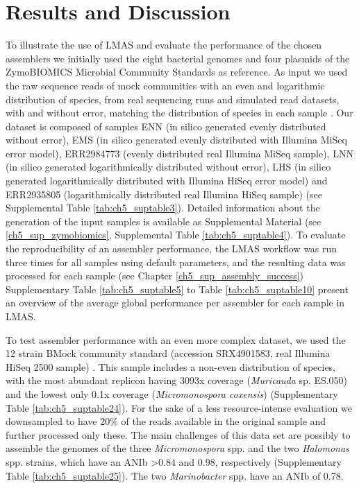 \section{Results and Discussion}

To illustrate the use of LMAS and evaluate the performance of the chosen assemblers we initially used the eight bacterial genomes and four plasmids of the ZymoBIOMICS Microbial Community Standards as reference. As input we used the raw sequence reads of mock communities with an even and logarithmic distribution of species, from real sequencing runs \cite{nicholls_ultra-deep_2019} and simulated read datasets, with and without error, matching the distribution of species in each sample \cite{gourle_simulating_2019}. Our dataset is composed of samples ENN (in silico generated evenly distributed without error), EMS (in silico generated evenly distributed with Illumina MiSeq error model), ERR2984773 (evenly distributed real Illumina MiSeq sample), LNN (in silico generated logarithmically distributed without error), LHS (in silico generated logarithmically distributed with Illumina HiSeq error model) and ERR2935805 (logarithmically distributed real Illumina HiSeq sample) (see Supplemental Table \ref{tab:ch5_suptable3}). Detailed information about the generation of the input samples is available as Supplemental Material (see \ref{ch5_sup_zymobiomics}, Supplemental Table \ref{tab:ch5_suptable4}). To evaluate the reproducibility of an assembler performance, the LMAS workflow was run three times for all samples using default parameters, and the resulting data was processed for each sample (see Chapter \ref{ch5_sup_assembly_success}) Supplementary Table \ref{tab:ch5_suptable5} to Table \ref{tab:ch5_suptable10} present an overview of the average global performance per assembler for each sample in LMAS. 

To test assembler performance with an even more complex dataset, we used the 12 strain BMock community standard (accession SRX4901583, real Illumina HiSeq 2500 sample) \cite{sevim_shotgun_2019}. This sample includes a non-even distribution of species, with the most abundant replicon having 3093x coverage (\textit{Muricauda} sp. ES.050) and the lowest only 0.1x coverage (\textit{Micromonospora coxensis}) (Supplementary Table \ref{tab:ch5_suptable24}). For the sake of a less resource-intense evaluation we downsampled to have 20\% of the reads available in the original sample and further processed only these. The main challenges of this data set are possibly to assemble the genomes of the three \textit{Micromonospora} spp. and the two \textit{Halomonas} spp. strains, which have an ANIb >0.84 and 0.98, respectively (Supplementary Table \ref{tab:ch5_suptable25}). The two \textit{Marinobacter} spp. have an ANIb of 0.78.

